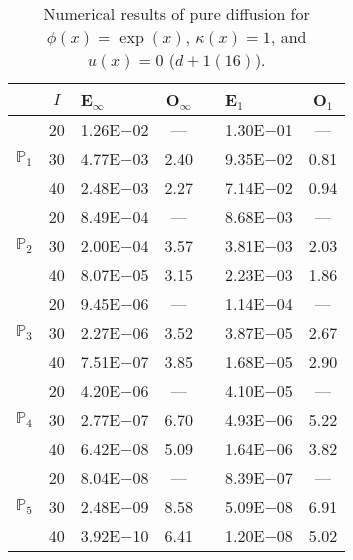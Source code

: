 \begin{table}[H]
\centering
\caption{Numerical results of pure diffusion for $\phi(x)=\exp(x)$, $\kappa(x)=1$, and $u(x)=0$ ($d+1 (16)$).}
\begin{tabular}{@{}l c l c c l c@{}}
\toprule
 & $I$ & E$_{\infty}$ & O$_{\infty}$ && E$_1$ & O$_1$\\
\midrule
\multirow{3}{*}{$\mathbb{P}_{1}$}
 & 20 & 1.26E$-$02 & --- && 1.30E$-$01 & ---\\
 & 30 & 4.77E$-$03 & 2.40 && 9.35E$-$02 & 0.81\\
 & 40 & 2.48E$-$03 & 2.27 && 7.14E$-$02 & 0.94\\
\midrule
\multirow{3}{*}{$\mathbb{P}_{2}$}
 & 20 & 8.49E$-$04 & --- && 8.68E$-$03 & ---\\
 & 30 & 2.00E$-$04 & 3.57 && 3.81E$-$03 & 2.03\\
 & 40 & 8.07E$-$05 & 3.15 && 2.23E$-$03 & 1.86\\
\midrule
\multirow{3}{*}{$\mathbb{P}_{3}$}
 & 20 & 9.45E$-$06 & --- && 1.14E$-$04 & ---\\
 & 30 & 2.27E$-$06 & 3.52 && 3.87E$-$05 & 2.67\\
 & 40 & 7.51E$-$07 & 3.85 && 1.68E$-$05 & 2.90\\
\midrule
\multirow{3}{*}{$\mathbb{P}_{4}$}
 & 20 & 4.20E$-$06 & --- && 4.10E$-$05 & ---\\
 & 30 & 2.77E$-$07 & 6.70 && 4.93E$-$06 & 5.22\\
 & 40 & 6.42E$-$08 & 5.09 && 1.64E$-$06 & 3.82\\
\midrule
\multirow{3}{*}{$\mathbb{P}_{5}$}
 & 20 & 8.04E$-$08 & --- && 8.39E$-$07 & ---\\
 & 30 & 2.48E$-$09 & 8.58 && 5.09E$-$08 & 6.91\\
 & 40 & 3.92E$-$10 & 6.41 && 1.20E$-$08 & 5.02\\
\bottomrule
\end{tabular}
\end{table}